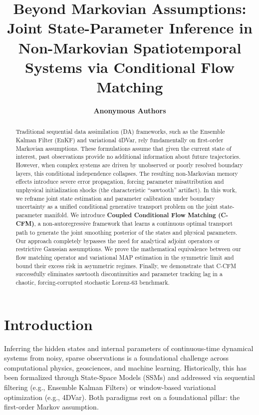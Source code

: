\documentclass[10pt]{article}
\title{\textbf{Beyond Markovian Assumptions: Joint State-Parameter Inference in Non-Markovian Spatiotemporal Systems via Conditional Flow Matching}}
\author{\textbf{Anonymous Authors}}
\date{}
\begin{document}
\maketitle

\begin{abstract}
Traditional sequential data assimilation (DA) frameworks, such as the Ensemble Kalman Filter (EnKF) and variational 4DVar, rely fundamentally on first-order Markovian assumptions. These formulations assume that given the current state of interest, past observations provide no additional information about future trajectories. However, when complex systems are driven by unobserved or poorly resolved boundary layers, this conditional independence collapses. The resulting non-Markovian memory effects introduce severe error propagation, forcing parameter misattribution and unphysical initialization shocks (the characteristic ``sawtooth'' artifact). In this work, we reframe joint state estimation and parameter calibration under boundary uncertainty as a unified conditional generative transport problem on the joint state-parameter manifold. We introduce \textbf{Coupled Conditional Flow Matching (C-CFM)}, a non-autoregressive framework that learns a continuous optimal transport path to generate the joint smoothing posterior of the states and physical parameters. Our approach completely bypasses the need for analytical adjoint operators or restrictive Gaussian assumptions. We prove the mathematical equivalence between our flow matching operator and variational MAP estimation in the symmetric limit and bound their excess risk in asymmetric regimes. Finally, we demonstrate that C-CFM successfully eliminates sawtooth discontinuities and parameter tracking lag in a chaotic, forcing-corrupted stochastic Lorenz-63 benchmark.
\end{abstract}

\section{Introduction}
Inferring the hidden states and internal parameters of continuous-time dynamical systems from noisy, sparse observations is a foundational challenge across computational physics, geosciences, and machine learning. Historically, this has been formalized through State-Space Models (SSMs) and addressed via sequential filtering (e.g., Ensemble Kalman Filters) or window-based variational optimization (e.g., 4DVar). Both paradigms rest on a foundational pillar: the first-order Markov assumption.
\end{document}
